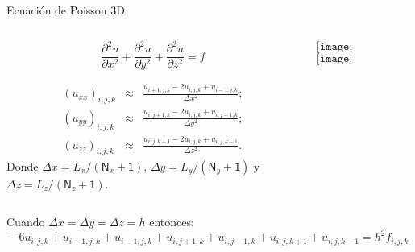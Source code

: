 \documentclass[handout]{beamer}
\begin{document}
\begin{frame}{Ecuaci\'on de Poisson 3D}

\begin{columns}
\begin{column}{0.70\textwidth}
\begin{small}
\[
\frac{\partial^2 u}{\partial x^2} + \frac{\partial^2 u}{\partial y^2} + \frac{\partial^2 u}{\partial z^2}= f
\]

\pause

\begin{eqnarray*}
(u_{xx})_{i,j,k} & \approx & \frac{u_{i+1,j,k} - 2 u_{i,j,k} + u_{i-1,j,k}}{\Delta x^2} ; \\
(u_{yy})_{i,j,k} & \approx & \frac{u_{i,j+1,k} - 2 u_{i,j,k} + u_{i,j-1,k}}{\Delta y^2} ; \\
(u_{zz})_{i,j,k} & \approx & \frac{u_{i,j,k+1} - 2 u_{i,j,k} + u_{i,j,k-1}}{\Delta z^2} .
\end{eqnarray*} 
Donde $\Delta x = L_x / (\textsf{N}_x + \textsf{1})$, $\Delta y = L_y / (\textsf{N}_y + \textsf{1})$
y $\Delta z = L_z / (\textsf{N}_z + \textsf{1})$. 
\end{small} 
\end{column}
\begin{column}{0.30\textwidth}
$$\texttt{[image: malla3D\_FDM]}$$
$$\texttt{[image: stencil3D\_FDM]}$$
\end{column}
\end{columns}

\pause

\begin{small}
Cuando $\Delta x = \Delta y = \Delta z = h$ entonces:
\[
\boxed{-6u_{i,j,k} +  u_{i+1,j,k} + u_{i-1,j,k} + u_{i,j+1,k} + u_{i,j-1,k} + u_{i,j,k+1} + u_{i,j,k-1} = h^2 f_{i,j,k}}
\]
\end{small}
\end{frame}
\end{document}
